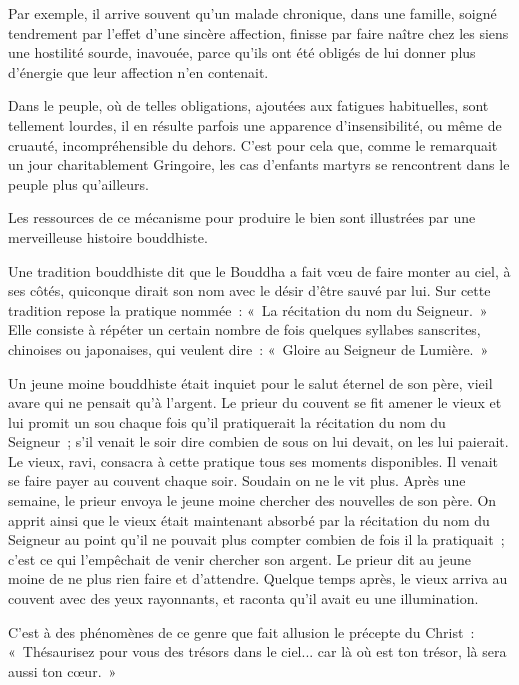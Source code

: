 \documentclass[french,twoside]{book} %
\begin{document}
Par exemple, il arrive souvent qu'un malade chronique, dans une famille, soigné tendrement par l'effet d'une sincère affection, finisse par faire naître chez les siens une hostilité sourde, inavouée, parce qu'ils ont été obligés de lui donner plus d'énergie que leur affection n'en contenait.\par
\par
Dans le peuple, où de telles obligations, ajoutées aux fatigues habituelles, sont tellement lourdes, il en résulte parfois une apparence d'insensibilité, ou même de cruauté, incompréhensible du dehors. C'est pour cela que, comme le remarquait un jour charitablement Gringoire, les cas d'enfants martyrs se rencontrent dans le peuple plus qu'ailleurs.\par
Les ressources de ce mécanisme pour produire le bien sont illustrées par une merveilleuse histoire bouddhiste.\par
Une tradition bouddhiste dit que le Bouddha a fait vœu de faire monter au ciel, à ses côtés, quiconque dirait son nom avec le désir d'être sauvé par lui. Sur cette tradition repose la pratique nommée : « La récitation du nom du Seigneur. » Elle consiste à répéter un certain nombre de fois quelques syllabes sanscrites, chinoises ou japonaises, qui veulent dire : « Gloire au Seigneur de Lumière. »\par
Un jeune moine bouddhiste était inquiet pour le salut éternel de son père, vieil avare qui ne pensait qu'à l'argent. Le prieur du couvent se fit amener le vieux et lui promit un sou chaque fois qu'il pratiquerait la récitation du nom du Seigneur ; s'il venait le soir dire combien de sous on lui devait, on les lui paierait. Le vieux, ravi, consacra à cette pratique tous ses moments disponibles. Il venait se faire payer au couvent chaque soir. Soudain on ne le vit plus. Après une semaine, le prieur envoya le jeune moine chercher des nouvelles de son père. On apprit ainsi que le vieux était maintenant absorbé par la récitation du nom du Seigneur au point qu'il ne pouvait plus compter combien de fois il la pratiquait ; c'est ce qui l'empêchait de venir chercher son argent. Le prieur dit au jeune moine de ne plus rien faire et d'attendre. Quelque temps après, le vieux arriva au couvent avec des yeux rayonnants, et raconta qu'il avait eu une illumination.\par
C'est à des phénomènes de ce genre que fait allusion le précepte du Christ : « Thésaurisez pour vous des trésors dans le ciel... car là où est ton trésor, là sera aussi ton cœur. »\par
\end{document}
